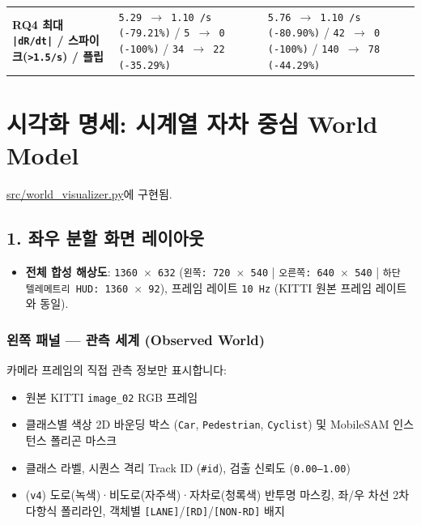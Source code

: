 \documentclass[10.5pt,a4paper]{article}
\begin{document}
\begin{footnotesize}
\begin{longtable}{>{\raggedright\arraybackslash}p{} >{\raggedright\arraybackslash}p{} >{\raggedright\arraybackslash}p{}}
\textbf{RQ4 최대 \texttt{|dR/\allowbreak{}dt|} / 스파이크(\texttt{>1.\allowbreak{}5/\allowbreak{}s}) / 플립} & \texttt{5.\allowbreak{}29 $\rightarrow$ 1.\allowbreak{}10 /\allowbreak{}s (-\allowbreak{}79.\allowbreak{}21\%)} / \texttt{5 $\rightarrow$ 0 (-\allowbreak{}100\%)} / \texttt{34 $\rightarrow$ 22 (-\allowbreak{}35.\allowbreak{}29\%)} & \texttt{5.\allowbreak{}76 $\rightarrow$ 1.\allowbreak{}10 /\allowbreak{}s (-\allowbreak{}80.\allowbreak{}90\%)} / \texttt{42 $\rightarrow$ 0 (-\allowbreak{}100\%)} / \texttt{140 $\rightarrow$ 78 (-\allowbreak{}44.\allowbreak{}29\%)} \\
\end{longtable}
\end{footnotesize}

\newpage
\section{시각화 명세: 시계열 자차 중심 World Model}

\href{https://github.com/Heisnotanimposter/Totalcare\_autonomous\_driving\_Yolov5/blob/main/src/world\_visualizer.py}{src/world\_visualizer.py}에 구현됨.


\subsection{1. 좌우 분할 화면 레이아웃}

\begin{itemize}[leftmargin=1.5em,itemsep=2pt]
\item \textbf{전체 합성 해상도}: \texttt{1360 $\times$ 632} (\texttt{왼쪽:\allowbreak{} 720 $\times$ 540} | \texttt{오른쪽:\allowbreak{} 640 $\times$ 540} | \texttt{하단 텔레메트리 HUD:\allowbreak{} 1360 $\times$ 92}), 프레임 레이트 \texttt{10 Hz} (KITTI 원본 프레임 레이트와 동일).
\end{itemize}

\subsubsection{왼쪽 패널 --- 관측 세계 (Observed World)}
카메라 프레임의 직접 관측 정보만 표시합니다:

\begin{itemize}[leftmargin=1.5em,itemsep=2pt]
\item 원본 KITTI \texttt{image\_\allowbreak{}02} RGB 프레임
\item 클래스별 색상 2D 바운딩 박스 (\texttt{Car}, \texttt{Pedestrian}, \texttt{Cyclist}) 및 MobileSAM 인스턴스 폴리곤 마스크
\item 클래스 라벨, 시퀀스 격리 Track ID (\texttt{\#id}), 검출 신뢰도 (\texttt{0.\allowbreak{}00--1.\allowbreak{}00})
\item (\texttt{v4}) 도로(녹색)·비도로(자주색)·자차로(청록색) 반투명 마스킹, 좌/우 차선 2차 다항식 폴리라인, 객체별 \texttt{[LANE]}/\texttt{[RD]}/\texttt{[NON-\allowbreak{}RD]} 배지
\end{itemize}
\end{document}
